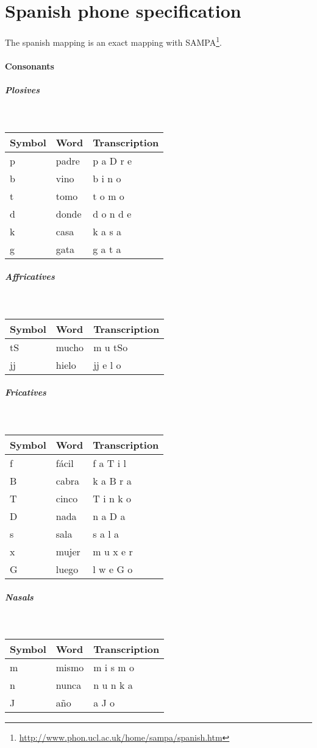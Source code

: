 \newpage
\section{Spanish phone specification}
\label{sec:slspanish}
The spanish mapping is an exact mapping with
SAMPA\footnote{\url{http://www.phon.ucl.ac.uk/home/sampa/spanish.htm}}.

\paragraph{Consonants}
\subparagraph{Plosives}\strut\\
\begin{tabular}{lll}
	Symbol & Word & Transcription\\
	\hline
 p & padre & p a D r e\\
 b & vino & b i n o\\
 t & tomo & t o m o\\
 d & donde & d o n d e\\
 k & casa & k a s a\\
 g & gata & g a t a
\end{tabular}

\subparagraph{Affricatives}\strut\\
\begin{tabular}{lll}
	Symbol & Word & Transcription\\
	\hline
	tS & mucho & m u tSo \\
	jj & hielo & jj e l o
\end{tabular}

\subparagraph{Fricatives}\strut\\
\begin{tabular}{lll}
	Symbol & Word & Transcription\\
	\hline
	f & fácil & f a T i l\\
	B & cabra & k a B r a\\
	T & cinco & T i n k o\\
	D & nada & n a D a\\
	s & sala & s a l a \\
	x & mujer & m u x e r\\
	G & luego & l w e G o
\end{tabular}

\subparagraph{Nasals}\strut\\
\begin{tabular}{lll}
	Symbol & Word & Transcription\\
	\hline
	m & mismo & m i s m o\\
	n & nunca & n u n k a\\
	J & año & a J o
\end{tabular}


